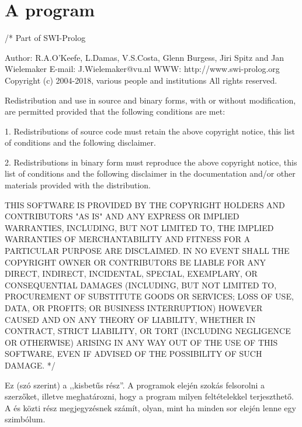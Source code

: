 \section{A program}
{\scriptsize
\begin{program}
/*  Part of SWI-Prolog

    Author:        R.A.O'Keefe, L.Damas, V.S.Costa, Glenn Burgess,
                   Jiri Spitz and Jan Wielemaker
    E-mail:        J.Wielemaker@vu.nl
    WWW:           http://www.swi-prolog.org
    Copyright (c)  2004-2018, various people and institutions
    All rights reserved.

    Redistribution and use in source and binary forms, with or without
    modification, are permitted provided that the following conditions
    are met:

    1. Redistributions of source code must retain the above copyright
       notice, this list of conditions and the following disclaimer.

    2. Redistributions in binary form must reproduce the above copyright
       notice, this list of conditions and the following disclaimer in
       the documentation and/or other materials provided with the
       distribution.

    THIS SOFTWARE IS PROVIDED BY THE COPYRIGHT HOLDERS AND CONTRIBUTORS
    "AS IS" AND ANY EXPRESS OR IMPLIED WARRANTIES, INCLUDING, BUT NOT
    LIMITED TO, THE IMPLIED WARRANTIES OF MERCHANTABILITY AND FITNESS
    FOR A PARTICULAR PURPOSE ARE DISCLAIMED. IN NO EVENT SHALL THE
    COPYRIGHT OWNER OR CONTRIBUTORS BE LIABLE FOR ANY DIRECT, INDIRECT,
    INCIDENTAL, SPECIAL, EXEMPLARY, OR CONSEQUENTIAL DAMAGES (INCLUDING,
    BUT NOT LIMITED TO, PROCUREMENT OF SUBSTITUTE GOODS OR SERVICES;
    LOSS OF USE, DATA, OR PROFITS; OR BUSINESS INTERRUPTION) HOWEVER
    CAUSED AND ON ANY THEORY OF LIABILITY, WHETHER IN CONTRACT, STRICT
    LIABILITY, OR TORT (INCLUDING NEGLIGENCE OR OTHERWISE) ARISING IN
    ANY WAY OUT OF THE USE OF THIS SOFTWARE, EVEN IF ADVISED OF THE
    POSSIBILITY OF SUCH DAMAGE.
*/
\end{program}
}\noindent%
Ez (szó szerint) a ,,kisbetűs rész''. A programok
elején szokás felsorolni a szerzőket, illetve
meghatározni, hogy a program milyen feltételekkel
terjeszthető. A \pr{/*} és \pr{*/} közti rész
megjegyzésnek számít, olyan, mint ha minden sor
elején lenne egy \pr{\%}
szimbólum.\index{\pr{/*\dots*/}}

